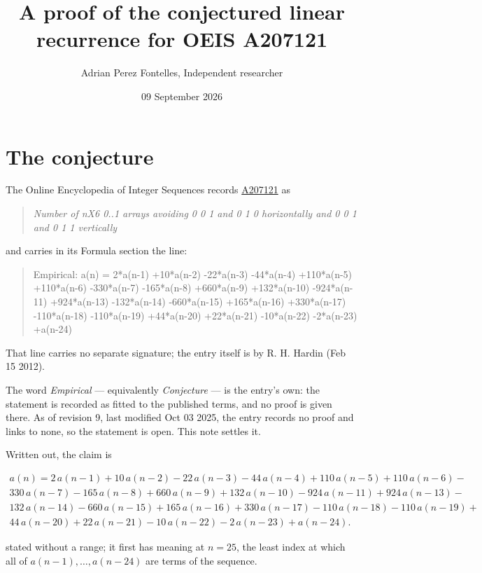 \documentclass[11pt]{article}
\title{A proof of the conjectured linear recurrence for OEIS A207121}
\author{Adrian Perez Fontelles, Independent researcher}
\date{09 September 2026}
\theoremstyle{definition}
\begin{document}
\maketitle
\section{The conjecture}

The Online Encyclopedia of Integer Sequences records \href{https://oeis.org/A207121}{A207121} as

\begin{quote}\itshape Number of nX6 0..1 arrays avoiding 0 0 1 and 0 1 0 horizontally and 0 0 1 and 0 1 1 vertically\end{quote}

and carries in its Formula section the line:

\begin{quote}\ttfamily Empirical: a(n) = 2*a(n-1) +10*a(n-2) -22*a(n-3) -44*a(n-4) +110*a(n-5) +110*a(n-6) -330*a(n-7) -165*a(n-8) +660*a(n-9) +132*a(n-10) -924*a(n-11) +924*a(n-13) -132*a(n-14) -660*a(n-15) +165*a(n-16) +330*a(n-17) -110*a(n-18) -110*a(n-19) +44*a(n-20) +22*a(n-21) -10*a(n-22) -2*a(n-23) +a(n-24)\end{quote}

That line carries no separate signature; the entry itself is by R. H. Hardin (Feb 15 2012).

The word {\itshape Empirical} --- equivalently {\itshape Conjecture} --- is the entry's own: the statement is recorded as fitted to the published terms, and no proof is given there. As of revision 9, last modified Oct 03 2025, the entry records no proof and links to none, so the statement is open. This note settles it.

Written out, the claim is

\begin{multline*} a(n) = 2\,a(n-1) + 10\,a(n-2) - 22\,a(n-3) - 44\,a(n-4) + 110\,a(n-5) + 110\,a(n-6) - \\ 330\,a(n-7) - 165\,a(n-8) + 660\,a(n-9) + 132\,a(n-10) - 924\,a(n-11) + 924\,a(n-13) - \\ 132\,a(n-14) - 660\,a(n-15) + 165\,a(n-16) + 330\,a(n-17) - 110\,a(n-18) - 110\,a(n-19) + \\ 44\,a(n-20) + 22\,a(n-21) - 10\,a(n-22) - 2\,a(n-23) + a(n-24). \end{multline*}

stated without a range; it first has meaning at $n = 25$, the least index at which all of $a(n-1),\dots,a(n-24)$ are terms of the sequence.
\end{document}
